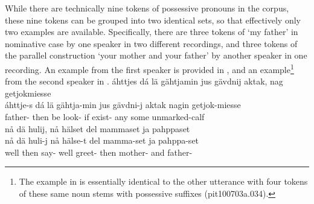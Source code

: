 While there are technically nine tokens of possessive pronouns in the corpus, these nine tokens can be grouped into two identical sets, so that effectively only two examples are available. Specifically, there are three tokens of  ‘my father’ in nominative case by one speaker in two different recordings, and three tokens of the parallel construction  ‘your mother and your father’ by another speaker in one recording. An example from the first speaker is provided in , and an example\footnote{The example in  is essentially identical to the other utterance with four tokens of these same noun stems with possessive suffixes (pit100703a.034).} 
from the second speaker in .
\ea\label{possSuffix1}%
\glll	áhttjes dá lä gähtjamin jus gävdnij aktak, nag getjokmiesse\\
	áhttje-s dá lä gähtja-min jus gävdni-j aktak nagin getjok-miesse\\
	father- then be\BS{} look- if exist- any some unmarked-calf\BS{}\\%
	
\z
\ea\label{possSuffix5}
\glll	nå dä hulij, nå hälset del mammaset ja pahppaset\\
	nå dä huli-j nå hälse-t del mamma-set ja pahppa-set\\
	well then say- well greet- then mother- and father- \\\nopagebreak
{}	
\z

